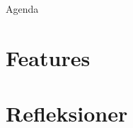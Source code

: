 

{
	\thispagestyle{empty}
	\frame{
  \aauwavesbg
  \finalpage{\insertsection\par}
	}
}
\AtBeginSection{\sectionpage}



{\aauwavesbg
\begin{frame}
	\titlepage
\end{frame}}

\begin{frame}{Agenda}{}
	{\footnotesize\tableofcontents}
\end{frame}








\section{Features}


\section{Refleksioner}



